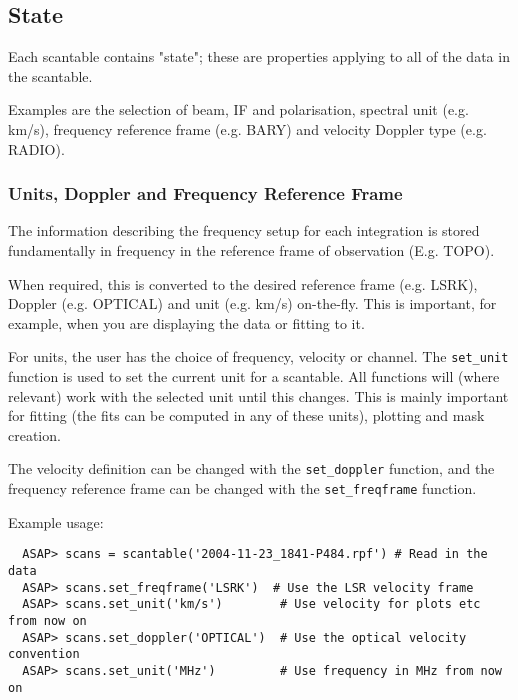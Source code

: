 \documentclass[11pt]{article}
\newcommand{\cmd}[1]{{\tt #1}}
\begin{document}

\subsection{State}

Each scantable contains "state"; these are
properties applying to all of the data in the scantable.

Examples are the selection of beam, IF and polarisation,  spectral unit
(e.g. km/s), frequency reference frame (e.g. BARY) and velocity Doppler
type (e.g. RADIO).

\subsubsection{Units, Doppler and Frequency Reference Frame}

The information describing the frequency setup for each integration
is stored fundamentally in frequency in the reference frame
of observation (E.g. TOPO).

When required, this is converted to the desired reference frame
(e.g. LSRK), Doppler (e.g. OPTICAL) and unit (e.g. km/s) on-the-fly.
This is important, for example, when you are displaying the data or
fitting to it.

For units, the user has the choice of frequency, velocity or channel.
The \cmd{set\_unit} function is used to set the current unit for a
scantable. All functions will (where relevant) work with the selected
unit until this changes. This is mainly important for fitting (the fits
can be computed in any of these units), plotting and mask creation.

The velocity definition can be changed with the \cmd{set\_doppler}
function, and the frequency reference frame can be changed with the
\cmd{set\_freqframe} function.

Example usage:

\begin{verbatim}
  ASAP> scans = scantable('2004-11-23_1841-P484.rpf') # Read in the data
  ASAP> scans.set_freqframe('LSRK')  # Use the LSR velocity frame
  ASAP> scans.set_unit('km/s')        # Use velocity for plots etc from now on
  ASAP> scans.set_doppler('OPTICAL')  # Use the optical velocity convention
  ASAP> scans.set_unit('MHz')         # Use frequency in MHz from now on
\end{verbatim}
\end{document}
